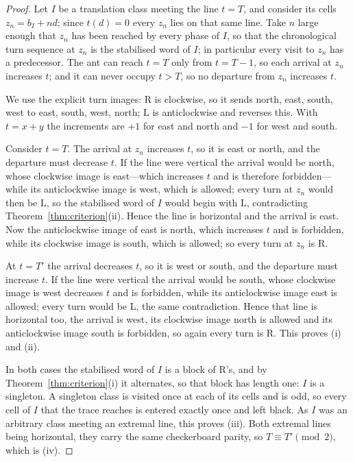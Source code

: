 \documentclass[11pt,reqno]{amsart}
\theoremstyle{plain}
\theoremstyle{definition}
\newcommand{\drift}{d}
\newcommand{\turnR}{\mathrm{R}}
\newcommand{\turnL}{\mathrm{L}}
\begin{document}
\begin{proof}
Let $I$ be a translation class meeting the line $t=T$, and consider its cells
$z_n=b_I+n\drift$; since $t(\drift)=0$ every $z_n$ lies on that same line. Take $n$
large enough that $z_n$ has been reached by every phase of $I$, so that the
chronological turn sequence at $z_n$ is the stabilised word of $I$; in particular
every visit to $z_n$ has a predecessor. The ant can reach $t=T$ only from $t=T-1$, so
each arrival at $z_n$ increases $t$; and it can never occupy $t>T$, so no departure
from $z_n$ increases $t$.

We use the explicit turn images: $\turnR$ is clockwise, so it sends north, east,
south, west to east, south, west, north; $\turnL$ is anticlockwise and reverses this.
With $t=x+y$ the increments are $+1$ for east and north and $-1$ for west and south.

Consider $t=T$. The arrival at $z_n$ increases $t$, so it is east or north, and the
departure must decrease $t$. If the line were vertical the arrival would be north,
whose clockwise image is east---which increases $t$ and is therefore forbidden---while
its anticlockwise image is west, which is allowed; every turn at $z_n$ would then be
$\turnL$, so the stabilised word of $I$ would begin with $\turnL$, contradicting
Theorem~\ref{thm:criterion}(ii). Hence the line is horizontal and the arrival is east.
Now the anticlockwise image of east is north, which increases $t$ and is forbidden,
while its clockwise image is south, which is allowed; so every turn at $z_n$ is
$\turnR$.

At $t=T'$ the arrival decreases $t$, so it is west or south, and the departure must
increase $t$. If the line were vertical the arrival would be south, whose clockwise
image is west decreases $t$ and is forbidden, while its anticlockwise image east is
allowed; every turn would be $\turnL$, the same contradiction. Hence that line is
horizontal too, the arrival is west, its clockwise image north is allowed and its
anticlockwise image south is forbidden, so again every turn is $\turnR$. This proves
(i) and (ii).

In both cases the stabilised word of $I$ is a block of $\turnR$'s, and by
Theorem~\ref{thm:criterion}(i) it alternates, so that block has length one: $I$ is a
singleton. A singleton class is visited once at each of its cells and is odd, so every
cell of $I$ that the trace reaches is entered exactly once and left black. As $I$ was
an arbitrary class meeting an extremal line, this proves (iii). Both extremal lines
being horizontal, they carry the same checkerboard parity, so $T\equiv T'\pmod2$,
which is (iv).
\end{proof}
\end{document}
